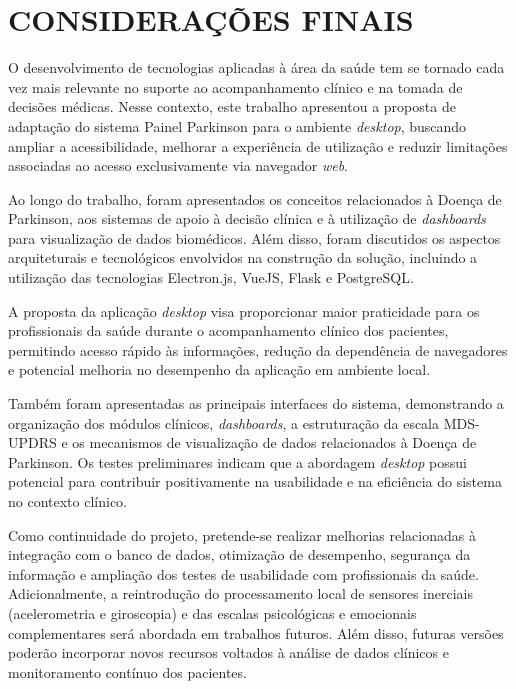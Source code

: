 
\chapter{CONSIDERAÇÕES FINAIS}
\label{chap:conclusao}

O desenvolvimento de tecnologias aplicadas à área da saúde tem se tornado cada vez mais relevante no suporte ao acompanhamento clínico e na tomada de decisões médicas. Nesse contexto, este trabalho apresentou a proposta de adaptação do sistema Painel Parkinson para o ambiente \textit{desktop}, buscando ampliar a acessibilidade, melhorar a experiência de utilização e reduzir limitações associadas ao acesso exclusivamente via navegador \textit{web}.

Ao longo do trabalho, foram apresentados os conceitos relacionados à Doença de Parkinson, aos sistemas de apoio à decisão clínica e à utilização de \textit{dashboards} para visualização de dados biomédicos. Além disso, foram discutidos os aspectos arquiteturais e tecnológicos envolvidos na construção da solução, incluindo a utilização das tecnologias Electron.js, VueJS, Flask e PostgreSQL.

A proposta da aplicação \textit{desktop} visa proporcionar maior praticidade para os profissionais da saúde durante o acompanhamento clínico dos pacientes, permitindo acesso rápido às informações, redução da dependência de navegadores e potencial melhoria no desempenho da aplicação em ambiente local.

Também foram apresentadas as principais interfaces do sistema, demonstrando a organização dos módulos clínicos, \textit{dashboards}, a estruturação da escala MDS-UPDRS e os mecanismos de visualização de dados relacionados à Doença de Parkinson. Os testes preliminares indicam que a abordagem \textit{desktop} possui potencial para contribuir positivamente na usabilidade e na eficiência do sistema no contexto clínico.

Como continuidade do projeto, pretende-se realizar melhorias relacionadas à integração com o banco de dados, otimização de desempenho, segurança da informação e ampliação dos testes de usabilidade com profissionais da saúde. Adicionalmente, a reintrodução do processamento local de sensores inerciais (acelerometria e giroscopia) e das escalas psicológicas e emocionais complementares será abordada em trabalhos futuros. Além disso, futuras versões poderão incorporar novos recursos voltados à análise de dados clínicos e monitoramento contínuo dos pacientes.

